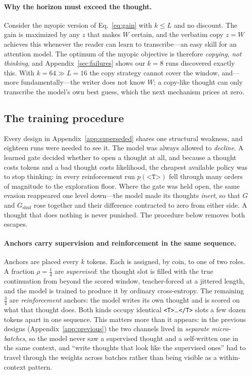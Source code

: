 \documentclass{article} %
\newcommand{\win}{W}
\newcommand{\thought}{z}
\newcommand{\gain}{G}
\newcommand{\tstart}{\texttt{<T>}}
\newcommand{\tend}{\texttt{</T>}}
\begin{document}
\paragraph{Why the horizon must exceed the thought.}
Consider the myopic version of Eq.~\eqref{eq:gain} with $k \le L$ and no discount. The gain is maximized by any $\thought$ that makes $\win$ certain, and the verbatim copy $\thought = \win$ achieves this whenever the reader can learn to transcribe---an easy skill for an attention model. The optimum of the myopic objective is therefore \emph{copying, not thinking}, and Appendix~\ref{sec:failures} shows our $k=8$ runs discovered exactly this. With $k = 64 \gg L = 16$ the copy strategy cannot cover the window, and---more fundamentally---the writer does not know $\win$; a copy-like thought can only transcribe the model's own best guess, which the next mechanism prices at zero.

\subsection{The training procedure}
\label{sec:procedure}

Every design in Appendix~\ref{app:superseded} shares one structural weakness, and eighteen runs were needed to see it. The model was always allowed to \emph{decline}. A learned gate decided whether to open a thought at all, and because a thought costs tokens and a bad thought costs likelihood, the cheapest available policy was to stop thinking: in every reinforcement run $p(\tstart)$ fell through many orders of magnitude to the exploration floor. Where the gate was held open, the same evasion reappeared one level down---the model made its thoughts \emph{inert}, so that $\gain$ and $\gain_{\mathrm{shuf}}$ rose together and their difference contracted to zero from either side. A thought that does nothing is never punished. The procedure below removes both escapes.

\paragraph{Anchors carry supervision and reinforcement in the same sequence.} Anchors are placed every $k$ tokens. Each is assigned, by coin, to one of two roles. A fraction $\rho = \tfrac14$ are \emph{supervised}: the thought slot is filled with the true continuation from beyond the scored window, teacher-forced at a jittered length, and the model is trained to produce it by ordinary cross-entropy. The remaining $\tfrac34$ are \emph{reinforcement} anchors: the model writes its own thought and is scored on what that thought does. Both kinds occupy identical \tstart{}\ldots\tend{} slots a few dozen tokens apart in one sequence. This matters more than it appears: in the previous designs (Appendix~\ref{app:previous}) the two channels lived in \emph{separate micro-batches}, so the model never saw a supervised thought and a self-written one in the same context, and ``write thoughts that look like the supervised ones'' had to travel through the weights across batches rather than being visible as a within-context pattern.
\end{document}
